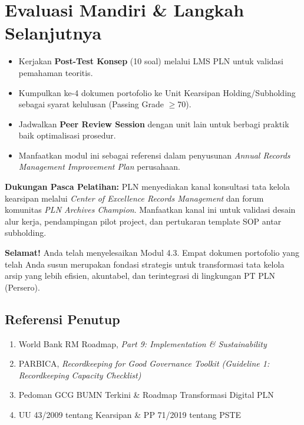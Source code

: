 \documentclass[12pt,a4paper]{report}
\begin{document}
\section{Evaluasi Mandiri \& Langkah Selanjutnya}
\begin{itemize}[leftmargin=*]
    \item Kerjakan \textbf{Post-Test Konsep} (10 soal) melalui LMS PLN untuk validasi pemahaman teoritis.
    \item Kumpulkan ke-4 dokumen portofolio ke Unit Kearsipan Holding/Subholding sebagai syarat kelulusan (Passing Grade $\geq$70).
    \item Jadwalkan \textbf{Peer Review Session} dengan unit lain untuk berbagi praktik baik optimalisasi prosedur.
    \item Manfaatkan modul ini sebagai referensi dalam penyusunan \textit{Annual Records Management Improvement Plan} perusahaan.
\end{itemize}

\begin{plnbox}
\textbf{Dukungan Pasca Pelatihan:} PLN menyediakan kanal konsultasi tata kelola kearsipan melalui \textit{Center of Excellence Records Management} dan forum komunitas \textit{PLN Archives Champion}. Manfaatkan kanal ini untuk validasi desain alur kerja, pendampingan pilot project, dan pertukaran template SOP antar subholding.
\end{plnbox}

\begin{outputbox}
\textbf{Selamat!} Anda telah menyelesaikan Modul 4.3. Empat dokumen portofolio yang telah Anda susun merupakan fondasi strategis untuk transformasi tata kelola arsip yang lebih efisien, akuntabel, dan terintegrasi di lingkungan PT PLN (Persero).
\end{outputbox}

\subsection*{Referensi Penutup}
\begin{enumerate}[leftmargin=*, nosep]
    \item World Bank RM Roadmap, \textit{Part 9: Implementation \& Sustainability}
    \item PARBICA, \textit{Recordkeeping for Good Governance Toolkit (Guideline 1: Recordkeeping Capacity Checklist)}
    \item Pedoman GCG BUMN Terkini \& Roadmap Transformasi Digital PLN
    \item UU 43/2009 tentang Kearsipan \& PP 71/2019 tentang PSTE
\end{enumerate}
\end{document}
